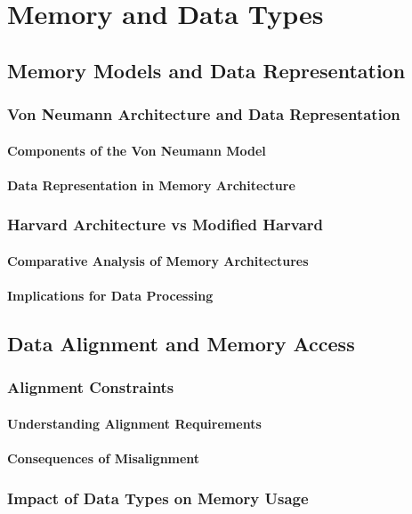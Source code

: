 \documentclass[12pt, oneside]{book}
\begin{document}
\chapter{Memory and Data Types}
\section{Memory Models and Data Representation}
\subsection{Von Neumann Architecture and Data Representation}
\subsubsection{Components of the Von Neumann Model}
\subsubsection{Data Representation in Memory Architecture}
\subsection{Harvard Architecture vs Modified Harvard}
\subsubsection{Comparative Analysis of Memory Architectures}
\subsubsection{Implications for Data Processing}
\section{Data Alignment and Memory Access}
\subsection{Alignment Constraints}
\subsubsection{Understanding Alignment Requirements}
\subsubsection{Consequences of Misalignment}
\subsection{Impact of Data Types on Memory Usage}
\end{document}
